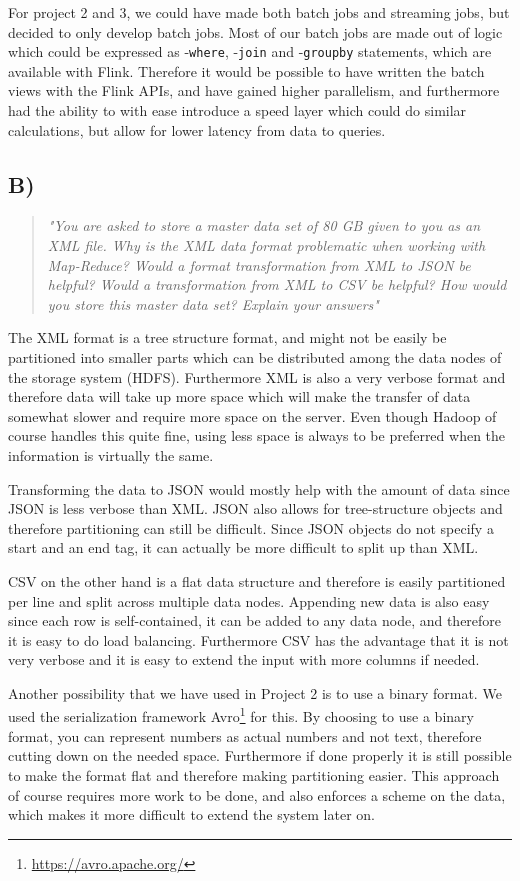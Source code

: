 \newpar For project 2 and 3, we could have made both batch jobs and streaming jobs, but decided to only develop batch jobs. Most of our batch jobs are made out of logic which could be expressed as -\texttt{where}, -\texttt{join} and -\texttt{groupby} statements, which are available with Flink. Therefore it would be possible to have written the batch views with the Flink APIs, and have gained higher parallelism, and furthermore had the ability to with ease introduce a speed layer which could do similar calculations, but allow for lower latency from data to queries.

\subsection{B)}
\begin{quote}
		\textit{"You	are	asked	to	store	a	master	data	set	of	80	GB	given	to	you	as	an	XML	file.	Why	is	the	XML	data	format	problematic	when	working	with	Map-Reduce?	Would	a	format	transformation	from	XML	to	JSON	be	helpful?	Would	a	transformation	from	XML	to	CSV	be	helpful?	How	would	you	store	this	master	data	set?	Explain	your	answers"}
\end{quote}
The XML format is a tree structure format, and might not be easily be partitioned into smaller parts which can be distributed among the data nodes of the storage system (HDFS). Furthermore XML is also a very verbose format and therefore data will take up more space which will make the transfer of data somewhat slower and require more space on the server. Even though Hadoop of course handles this quite fine, using less space is always to be preferred when the information is virtually the same. 

\newpar Transforming the data to JSON would mostly help with the amount of data since JSON is less verbose than XML. JSON also allows for tree-structure objects and therefore partitioning can still be difficult. Since JSON objects do not specify a start and an end tag, it can actually be more difficult to split up than XML. 

\newpar CSV on the other hand is a flat data structure and therefore is easily partitioned per line and split across multiple data nodes. Appending new data is also easy since each row is self-contained, it can be added to any data node, and therefore it is easy to do load balancing. Furthermore CSV has the advantage that it is not very verbose and it is easy to extend the input with more columns if needed.

\newpar Another possibility that we have used in Project 2 is to use a binary format. We used the serialization framework Avro\footnote{\url{https://avro.apache.org/}} for this. By choosing to use a binary format, you can represent numbers as actual numbers and not text, therefore cutting down on the needed space. Furthermore if done properly it is still possible to make the format flat and therefore making partitioning easier. This approach of course requires more work to be done, and also enforces a scheme on the data, which makes it more difficult to extend the system later on.

